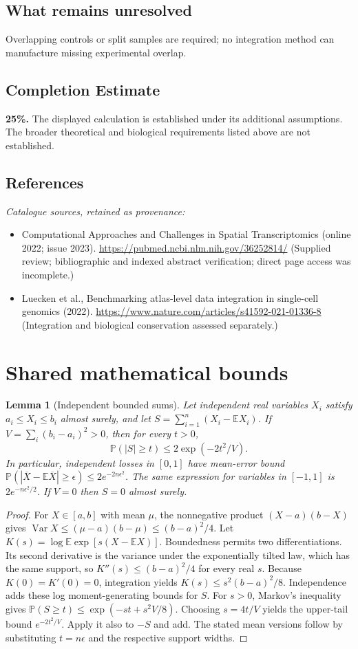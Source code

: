 \documentclass[11pt]{article}
\newcommand{\E}{\mathbb E}
\newcommand{\Prob}{\mathbb P}
\DeclareMathOperator{\Var}{Var}
\providecommand{\E}{\mathbb E}
\providecommand{\Prob}{\mathbb P}
\providecommand{\Var}{\operatorname{Var}}
\newtheorem{sharedlemma}{Lemma}[section]
\begin{document}
\subsection{What remains unresolved}
Overlapping controls or split samples are required; no integration method can manufacture missing experimental overlap.
\subsection{Completion Estimate}
\textbf{25\%.} The displayed calculation is established under its additional assumptions. The broader theoretical and biological requirements listed above are not established.
\subsection{References}
\noindent\emph{Catalogue sources, retained as provenance:}
\begin{itemize}
\item Computational Approaches and Challenges in Spatial Transcriptomics (online 2022; issue 2023). \url{https://pubmed.ncbi.nlm.nih.gov/36252814/} (Supplied review; bibliographic and indexed abstract verification; direct page access was incomplete.)
\item Luecken et al., Benchmarking atlas-level data integration in single-cell genomics (2022). \url{https://www.nature.com/articles/s41592-021-01336-8} (Integration and biological conservation assessed separately.)
\end{itemize}
\clearpage


\appendix
\section{Shared mathematical bounds}\label{app:bounds}
\begin{sharedlemma}[Independent bounded sums]\label{lem:bounded}
Let independent real variables $X_i$ satisfy $a_i\leq X_i\leq b_i$ almost surely,
and let $S=\sum_{i=1}^n(X_i-\E X_i)$. If
$V=\sum_i(b_i-a_i)^2>0$, then for every $t>0$,
\[
 \Prob(|S|\geq t)\leq 2\exp(-2t^2/V).
\]
In particular, independent losses in $[0,1]$ have mean-error bound
$\Prob(|\overline X-\E\overline X|\geq\epsilon)
\leq2e^{-2n\epsilon^2}$. The same expression for variables in $[-1,1]$
is $2e^{-n\epsilon^2/2}$. If $V=0$ then $S=0$ almost surely.
\end{sharedlemma}
\begin{proof}
For $X\in[a,b]$ with mean $\mu$, the nonnegative product
$(X-a)(b-X)$ gives
$\Var X\leq(\mu-a)(b-\mu)\leq(b-a)^2/4$.
Let $K(s)=\log\E\exp[s(X-\E X)]$.
Boundedness permits two differentiations. Its second derivative is the variance
under the exponentially tilted law, which has the same support, so
$K''(s)\leq(b-a)^2/4$ for every real $s$.
Because $K(0)=K'(0)=0$, integration yields
$K(s)\leq s^2(b-a)^2/8$.
Independence adds these log moment-generating bounds for $S$.
For $s>0$, Markov's inequality gives
$\Prob(S\geq t)\leq\exp(-st+s^2V/8)$.
Choosing $s=4t/V$ yields the upper-tail bound $e^{-2t^2/V}$.
Apply it also to $-S$ and add. The stated mean versions follow by substituting
$t=n\epsilon$ and the respective support widths.
\end{proof}
\end{document}
